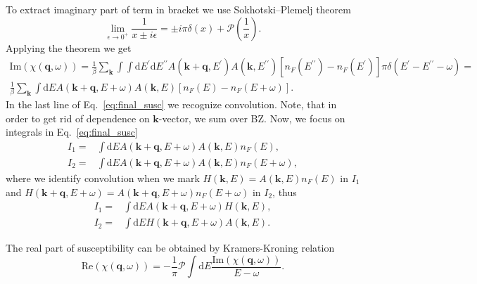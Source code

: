 \documentclass[preprint,prb,amsmath,superscriptaddress,showpacs]{revtex4}
\begin{document}
%
To extract imaginary part of term in bracket we use Sokhotski–Plemelj
theorem
%
\begin{equation}
\lim_{\epsilon \rightarrow 0^{+}} \frac{1}{x \pm i\epsilon} = \pm
i\pi\delta (x) + \mathcal{P}\left( \frac{1}{x} \right).
\end{equation}
%
Applying the theorem we get
%
\begin{equation}
    \begin{gathered}
 \mathrm{Im} (\chi(\mathbf{q}, \omega)) =  \frac{1}{\beta} \sum_{\mathbf{k}} \int \int
      \mathrm{d}E^{\prime} \mathrm{d}E^{\prime \prime} A(\mathbf{k} +
      \mathbf{q}, E^{\prime}) A(\mathbf{k}, E^{\prime \prime}) \left[
        n_F(E^{\prime \prime}) - n_F(E^{\prime}) \right] \pi
      \delta(E^{\prime} - E^{\prime \prime} - \omega) = \\
       \frac{1}{\beta} \sum_{\mathbf{k}} \int
      \mathrm{d}E A(\mathbf{k} +
      \mathbf{q}, E + \omega) A(\mathbf{k}, E) \left[
        n_F(E) - n_F(E + \omega) \right].
    \end{gathered}
    \label{eq:final_susc}
\end{equation}
%
In the last line of Eq.~\eqref{eq:final_susc} we recognize convolution. Note, that in order to get rid of dependence on $\mathbf{k}$-vector,
we sum over BZ. Now, we focus on integrals in Eq.~\eqref{eq:final_susc}
%
\begin{align*}
I_1 =& \int  \mathrm{d}E A(\mathbf{k} +
       \mathbf{q}, E + \omega) A(\mathbf{k}, E) n_F(E), \\
I_2 =& \int  \mathrm{d}E A(\mathbf{k} +
       \mathbf{q}, E + \omega) A(\mathbf{k}, E) n_F(E+\omega),
\end{align*}
%
where we identify convolution when we mark $H(\mathbf{k}, E) =
A(\mathbf{k}, E) n_F(E)$ in $I_1$ and $H(\mathbf{k}+\mathbf{q}, E+\omega) =
A(\mathbf{k} + \mathbf{q}, E + \omega) n_F(E+\omega)$ in $I_2$, thus
%
\begin{align*}
I_1 =& \int  \mathrm{d}E A(\mathbf{k} +
       \mathbf{q}, E + \omega) H(\mathbf{k}, E), \\
I_2 =& \int  \mathrm{d}E H(\mathbf{k} +
       \mathbf{q}, E + \omega) A(\mathbf{k}, E).
\end{align*}
%

The real part of susceptibility can be obtained by
Kramers-Kroning relation
%
\begin{equation}
\mathrm{Re} (\chi(\mathbf{q}, \omega)) = - \frac{1}{\pi} \mathcal{P} \int
\mathrm{d} E \frac{\mathrm{Im} (\chi(\mathbf{q}, \omega))}{E - \omega}.
\end{equation}
%

\iffalse
Using RPA approximation we can further write spectral function
$A(\mathbf{k}, E)$ as
%
\begin{equation}
A(\mathbf{k}, E) = - \frac{1}{\pi} \mathrm{Im} (G_{\mathrm{ret}}(\mathbf{k}, E)) =
\frac{1}{\pi} \frac{-\mathrm{Im}(\Sigma)}{\left( E -
    \varepsilon_{\mathbf{k}} + \mu - \mathrm{Re}(\Sigma) \right)^2 + (\mathrm{Im}(\Sigma))^2}.
\end{equation}
%
Here, $\Sigma$ marks RPA self-energy.
\fi
\end{document}
